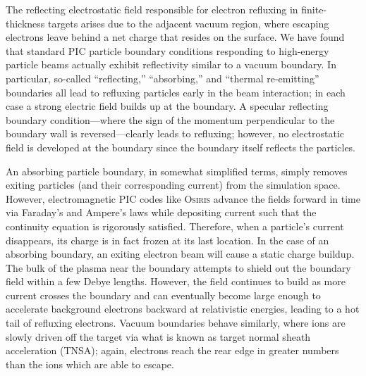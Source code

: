 \documentclass[../absorber.tex]{subfiles}
\begin{document}
The reflecting electrostatic field responsible for electron refluxing in finite-thickness targets arises due to the adjacent vacuum region, where escaping electrons leave behind a net charge that resides on the surface. We have found that standard PIC particle boundary conditions responding to high-energy particle beams actually exhibit reflectivity similar to a vacuum boundary.  In particular, so-called ``reflecting,'' ``absorbing,'' and ``thermal re-emitting'' boundaries all lead to refluxing particles early in the beam interaction; in each case a strong electric field builds up at the boundary.  A specular reflecting boundary condition---where the sign of the momentum perpendicular to the boundary wall is reversed---clearly leads to refluxing; however, no electrostatic field is developed at the boundary since the boundary itself reflects the particles.

An absorbing particle boundary, in somewhat simplified terms, simply removes exiting particles (and their corresponding current) from the simulation space.  However, electromagnetic PIC codes like \textsc{Osiris} advance the fields forward in time via Faraday's and Ampere's laws while depositing current such that the continuity equation is rigorously satisfied. Therefore, when a particle's current disappears, its charge is in fact frozen at its last location.  In the case of an absorbing boundary, an exiting electron beam will cause a static charge buildup.
The bulk of the plasma near the boundary attempts to shield out the boundary field within a few Debye lengths.  However, the field continues to build as more current crosses the boundary and can eventually become large enough to accelerate background electrons backward at relativistic energies, leading to a hot tail of refluxing electrons.
Vacuum boundaries behave similarly, where ions are slowly driven off the target via what is known as target normal sheath acceleration\cite{Wilks2001EnergeticInteractions,Mora2003PlasmaVacuum} (TNSA); again, electrons reach the rear edge in greater numbers than the ions which are able to escape.
\end{document}
